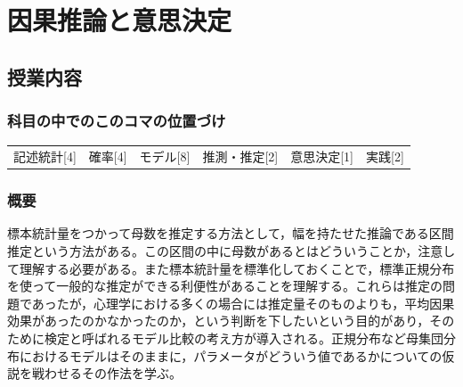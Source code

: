 \section{因果推論と意思決定}
\label{lesson17}

\subsection{授業内容}
\subsubsection{科目の中でのこのコマの位置づけ}
\begin{tabular}[t]{cccccc}
    記述統計[4] & 確率[4] & モデル[8] & 推測・推定[2] & 意思決定[1] & 実践[2]
\end{tabular}
\subsubsection{概要}
標本統計量をつかって母数を推定する方法として，幅を持たせた推論である区間推定という方法がある。この区間の中に母数があるとはどういうことか，注意して理解する必要がある。また標本統計量を標準化しておくことで，標準正規分布を使って一般的な推定ができる利便性があることを理解する。これらは推定の問題であったが，心理学における多くの場合には推定量そのものよりも，平均因果効果があったのかなかったのか，という判断を下したいという目的があり，そのために検定と呼ばれるモデル比較の考え方が導入される。正規分布など母集団分布におけるモデルはそのままに，パラメータがどういう値であるかについての仮説を戦わせるその作法を学ぶ。
